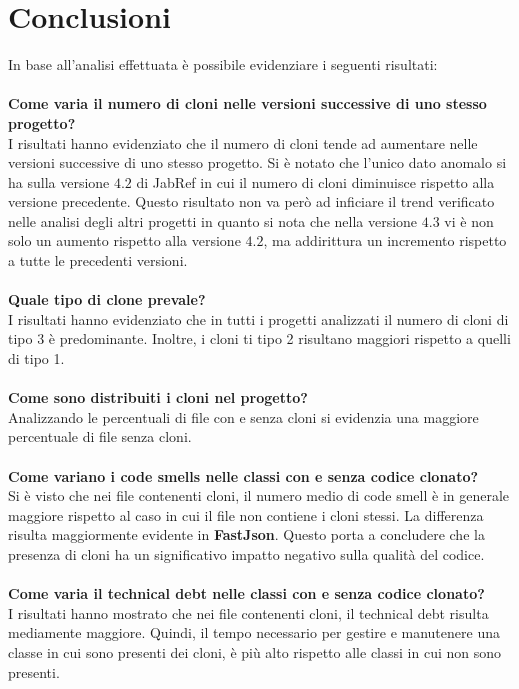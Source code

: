 \chapter{Conclusioni}\label{cap5}
In base all'analisi effettuata è possibile evidenziare i seguenti risultati: \\ \\
\textbf{Come varia il numero di cloni nelle versioni successive di uno stesso progetto?}\\ 
I risultati hanno evidenziato che il numero di cloni tende ad aumentare nelle versioni successive di uno stesso progetto. Si è notato che l'unico dato anomalo si ha sulla versione $4.2$ di JabRef in cui il numero di cloni diminuisce rispetto alla versione precedente. Questo risultato non va però ad inficiare il trend verificato nelle analisi degli altri progetti in quanto si nota che nella versione $4.3$ vi è non solo un aumento rispetto alla versione $4.2$, ma addirittura un incremento rispetto a tutte le precedenti versioni. \\ \\
\textbf{Quale tipo di clone prevale?}\\
I risultati hanno evidenziato che in tutti i progetti analizzati il numero di cloni di tipo 3 è predominante. Inoltre, i cloni ti tipo 2 risultano maggiori rispetto a quelli di tipo 1.\\ \\
\textbf{Come sono distribuiti i cloni nel progetto?}\\ 
Analizzando le percentuali di file con e senza cloni si evidenzia una maggiore percentuale di file senza cloni. \\ \\
\textbf{Come variano i code smells nelle classi con e senza codice clonato?}\\
Si è visto che nei file contenenti cloni, il numero medio di code smell è in generale maggiore rispetto al caso in cui il file non contiene i cloni stessi. La differenza risulta maggiormente evidente in \textbf{FastJson}. Questo porta a concludere che la presenza di cloni ha un significativo impatto negativo sulla qualità del codice. \\ \\
\textbf{Come varia il technical debt nelle classi con e senza codice clonato?}\\
I risultati hanno mostrato che nei file contenenti cloni, il technical debt risulta mediamente maggiore. Quindi, il tempo necessario per gestire e manutenere una classe in cui sono presenti dei cloni, è più alto rispetto alle classi in cui non sono presenti. \newpage
